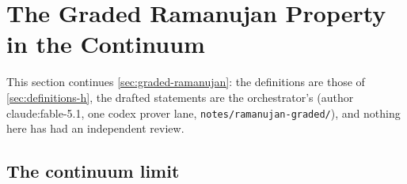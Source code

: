 
\section{The Graded Ramanujan Property in the Continuum}
\label{sec:graded-ramanujan-continuum}

This section continues \cref{sec:graded-ramanujan}: the definitions are those of
\cref{sec:definitions-h}, the drafted statements are the orchestrator's (author claude:fable-5.1,
one codex prover lane, \texttt{notes/ramanujan-graded/}), and nothing here has had an independent
review.

\subsection{The continuum limit}

